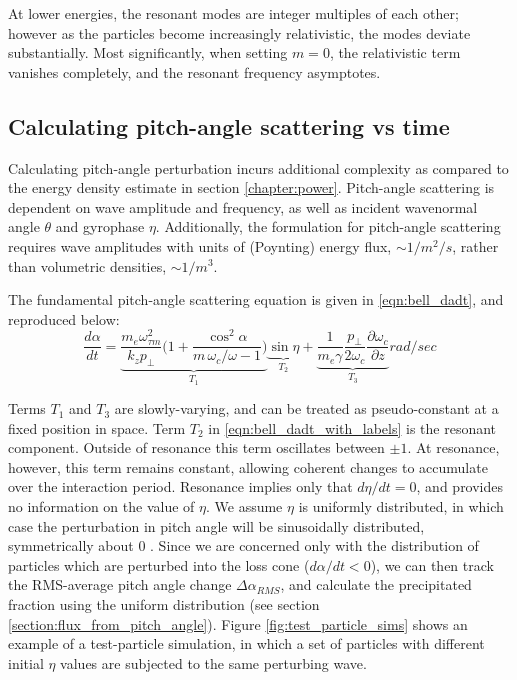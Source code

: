 At lower energies, the resonant modes are integer multiples of each other; however as the particles become increasingly relativistic, the modes deviate substantially. Most significantly, when setting $m=0$, the relativistic term vanishes completely, and the resonant frequency asymptotes.

\subsection{Calculating pitch-angle scattering vs time}

Calculating pitch-angle perturbation incurs additional complexity as compared to the energy density estimate in section \ref{chapter:power}. Pitch-angle scattering is dependent on wave amplitude and frequency, as well as incident wavenormal angle $\theta$ and gyrophase $\eta$. Additionally, the formulation for pitch-angle scattering requires wave amplitudes with units of (Poynting) energy flux, $\sim 1/m^2/s$, rather than volumetric densities, $\sim 1/m^3$.

The fundamental pitch-angle scattering equation is given in \eqref{eqn:bell_dadt}, and reproduced below:
\begin{equation}
\frac{d\alpha}{dt} = \underbrace{\frac{m_e \omega_{\tau m}^2}{k_z p_\perp} \bigg( 1 + \frac{\cos^2\alpha}{m\,\omega_c / \omega - 1}\bigg)}_{T_1}\underbrace{\sin \eta}_{T_2} + \underbrace{\frac{1}{m_e \gamma}\frac{p_\perp}{2 \omega_c}\frac{\partial \omega_c}{\partial z}}_{T_3} \unit{rad/sec}
\label{eqn:bell_dadt_with_labels}
\end{equation}

Terms $T_1$ and $T_3$ are slowly-varying, and can be treated as pseudo-constant at a fixed position in space. Term $T_2$ in \eqref{eqn:bell_dadt_with_labels} is the resonant component. Outside of resonance this term oscillates between $\pm 1$. At resonance, however, this term remains constant, allowing coherent changes to accumulate over the interaction period. Resonance implies only that $d\eta/dt = 0$, and provides no information on the value of $\eta$. We assume $\eta$ is uniformly distributed, in which case the perturbation in pitch angle will be sinusoidally distributed, symmetrically about 0 \citep{Inan1977}. Since we are concerned only with the distribution of particles which are perturbed into the loss cone ($d\alpha/dt < 0$), we can then track the RMS-average pitch angle change $\Delta \alpha_{RMS}$, and calculate the precipitated fraction using the uniform distribution (see section \ref{section:flux_from_pitch_angle}).
Figure \ref{fig:test_particle_sims} shows an example of a test-particle simulation, in which a set of particles with different initial $\eta$ values are subjected to the same perturbing wave.

